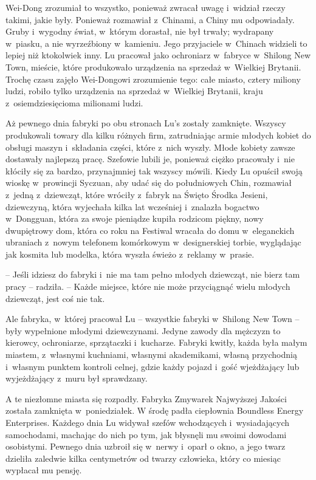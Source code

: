 \documentclass[oneside,polish,11pt,rmheadings]{mwbk}
\begin{document}
Wei-Dong zrozumiał to wszystko, ponieważ zwracał uwagę i~widział rzeczy takimi, jakie były. Ponieważ rozmawiał z~Chinami, a Chiny mu odpowiadały. Gruby i~wygodny świat, w~którym dorastał, nie był trwały; wydrapany w~piasku, a nie wyrzeźbiony w~kamieniu. Jego przyjaciele w~Chinach widzieli to lepiej niż ktokolwiek inny. Lu pracował jako ochroniarz w~fabryce w~Shilong New Town, mieście, które produkowało urządzenia na sprzedaż w~Wielkiej Brytanii. Trochę czasu zajęło Wei-Dongowi zrozumienie tego: całe miasto, cztery miliony ludzi, robiło tylko urządzenia na sprzedaż w~Wielkiej Brytanii, kraju z~osiemdziesięcioma milionami ludzi. 


Aż pewnego dnia fabryki po obu stronach Lu's zostały zamknięte. Wszyscy produkowali towary dla kilku różnych firm, zatrudniając armie młodych kobiet do obsługi maszyn i~składania części, które z~nich wyszły. Młode kobiety zawsze dostawały najlepszą pracę. Szefowie lubili je, ponieważ ciężko pracowały i~nie kłóciły się za bardzo, przynajmniej tak wszyscy mówili. Kiedy Lu opuścił swoją wioskę w~prowincji Syczuan, aby udać się do południowych Chin, rozmawiał z~jedną z~dziewcząt, które wróciły z~fabryk na Święto Środka Jesieni, dziewczyną, która wyjechała kilka lat wcześniej i~znalazła bogactwo w~Dongguan, która za swoje pieniądze kupiła rodzicom piękny, nowy dwupiętrowy dom, która co roku na Festiwal wracała do domu w~eleganckich ubraniach z~nowym telefonem komórkowym w~designerskiej torbie, wyglądając jak kosmita lub modelka, która wyszła świeżo z~reklamy w~prasie. 


-- Jeśli idziesz do fabryki i~nie ma tam pełno młodych dziewcząt, nie bierz tam pracy -- radziła. -- Każde miejsce, które nie może przyciągnąć wielu młodych dziewcząt, jest coś nie tak.

 Ale fabryka, w~której pracował Lu -- wszystkie fabryki w~Shilong New Town -- były wypełnione młodymi dziewczynami. Jedyne zawody dla mężczyzn to kierowcy, ochroniarze, sprzątaczki i~kucharze. Fabryki kwitły, każda była małym miastem, z~własnymi kuchniami, własnymi akademikami, własną przychodnią i~własnym punktem kontroli celnej, gdzie każdy pojazd i~gość wjeżdżający lub wyjeżdżający z~muru był sprawdzany. 


A te niezłomne miasta się rozpadły. Fabryka Zmywarek Najwyższej Jakości została zamknięta w~poniedziałek. W środę padła ciepłownia Boundless Energy Enterprises. Każdego dnia Lu widywał szefów wchodzących i~wysiadających samochodami, machając do nich po tym, jak błysnęli mu swoimi dowodami osobistymi. Pewnego dnia uzbroił się w~nerwy i~oparł o okno, a jego twarz dzieliła zaledwie kilka centymetrów od twarzy człowieka, który co miesiąc wypłacał mu pensję. 
\end{document}
